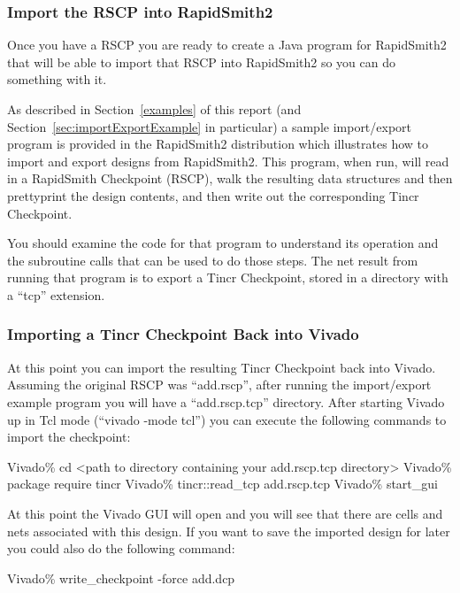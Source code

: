 \subsubsection{Import the RSCP into RapidSmith2}
Once you have a RSCP you are ready to create a Java program for RapidSmith2 that will be
able to import that RSCP into RapidSmith2 so you can do something with it.

As described in Section~\ref{examples} of this report (and
Section~\ref{sec:importExportExample} in particular) a sample import/export program
is provided in the RapidSmith2 distribution which illustrates how to import
and export designs from RapidSmith2.  This program, when run, will read in a
RapidSmith Checkpoint (RSCP), walk the resulting data structures and
then prettyprint the design contents, and then write out the
corresponding Tincr Checkpoint.   

You should examine the code for that
program to understand its operation and the subroutine calls that can
be used to do those steps.  The net result from running that program
is to export a Tincr Checkpoint, stored in a directory with a ``tcp'' extension.

\subsubsection{Importing a Tincr Checkpoint Back into Vivado}
At this point you can import the resulting Tincr Checkpoint back into Vivado. 
Assuming the original RSCP was ``add.rscp'', after running the import/export
example program  you will have a ``add.rscp.tcp'' directory.  After starting
Vivado up in Tcl mode (``vivado -mode tcl'') you can execute the following
commands to import the checkpoint:

\vspace{-0.15in}  \begin{code}
	Vivado\% cd <path to directory containing your add.rscp.tcp directory>
	Vivado\% package require tincr
	Vivado\% tincr::read_tcp add.rscp.tcp
	Vivado\% start_gui
\end{code}

At this point the Vivado GUI will open and you will see that there are cells and
nets associated with this design.  If you want to save the imported design for
later you could also do the following command:

\vspace{-0.15in}  \begin{code}
	Vivado\% write_checkpoint -force add.dcp
\end{code}

